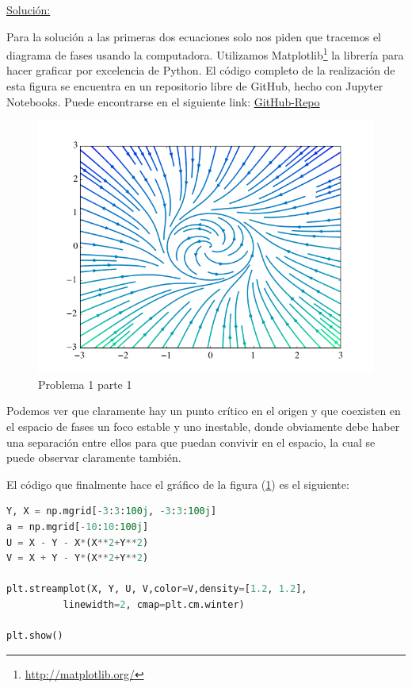 \documentclass[a4paper,10pt]{article}
\begin{document}
\vspace{.3cm}

\underline{Solución:}

Para la solución a las primeras dos ecuaciones solo nos piden que tracemos el diagrama
de fases usando la computadora. Utilizamos Matplotlib\footnote{\href{http://matplotlib.org/}{http://matplotlib.org/}} la librería para hacer graficar 
por excelencia de Python. El código completo de la realización de esta figura se encuentra
en un repositorio libre de GitHub, hecho con Jupyter Notebooks. Puede encontrarse en el
siguiente link: \href{https://github.com/FavioVazquez/MecanicaClasica-PCF/blob/master/Tarea2/Tarea2\%20-\%20Problema1.ipynb}{GitHub-Repo}

\begin{figure}[ht]
 \centering
\includegraphics[scale=0.5]{problema1fig1}
\caption{Problema 1 parte 1}
\label{fig:problema1fig1}
\end{figure}


\vspace{.3cm}

Podemos ver que claramente hay un punto crítico en el origen y que coexisten 
en el espacio de fases un foco estable y uno inestable, donde obviamente debe haber
una separación entre ellos para que puedan convivir en el espacio, la cual se puede
observar claramente también.

\vspace{.3cm}

El código que finalmente hace el gráfico de la figura (\ref{fig:problema1fig1}) es el siguiente:

\begin{lstlisting}[language=Python]
Y, X = np.mgrid[-3:3:100j, -3:3:100j]
a = np.mgrid[-10:10:100j]
U = X - Y - X*(X**2+Y**2)
V = X + Y - Y*(X**2+Y**2)

plt.streamplot(X, Y, U, V,color=V,density=[1.2, 1.2], 
	      linewidth=2, cmap=plt.cm.winter)

plt.show()
\end{lstlisting}
\end{document}
